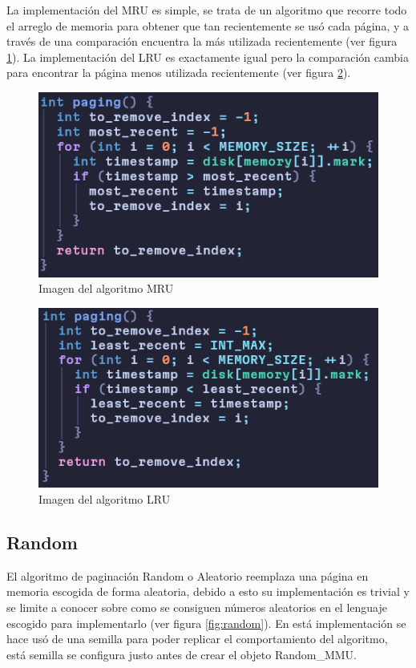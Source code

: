 \documentclass{report}
\begin{document}
La implementación del MRU es simple, se trata de un algoritmo que recorre todo el arreglo de memoria para obtener que tan recientemente se usó cada página, y a través de una comparación encuentra la más utilizada recientemente (ver figura \ref{fig:mru}). La implementación del LRU es exactamente igual pero la comparación cambia para encontrar la página menos utilizada recientemente (ver figura \ref{fig:lru}).

\begin{figure}[h]
	\centering
	\includegraphics[width=0.8\linewidth]{figuras/mru.png}
	\caption{Imagen del algoritmo MRU}
	\label{fig:mru}
\end{figure}

\begin{figure}[h]
	\centering
	\includegraphics[width=0.8\linewidth]{figuras/lru.png}
	\caption{Imagen del algoritmo LRU }
	\label{fig:lru}
\end{figure}
  

\subsection{Random}

El algoritmo de paginación Random o Aleatorio reemplaza una página en memoria escogida de forma aleatoria, debido a esto su implementación es trivial y se limite a conocer sobre como se consiguen números aleatorios en el lenguaje escogido para implementarlo (ver figura \ref{fig:random}). En está implementación se hace usó de una semilla para poder replicar el comportamiento del algoritmo, está semilla se configura justo antes de crear el objeto Random\_MMU.
\end{document}
